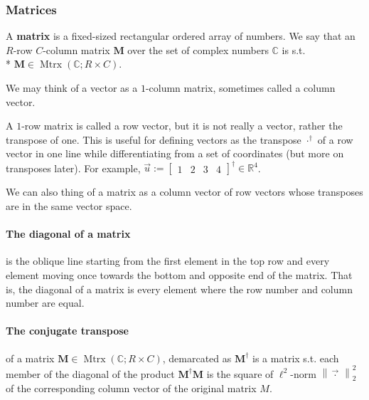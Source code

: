 \documentclass{article}
\begin{document}
\subsubsection{Matrices}
A \textbf{matrix} is a fixed-sized rectangular ordered array of numbers. We say that an $R$-row $C$-column matrix $\mathbf{M}$ over the set of complex numbers $\mathbb{C}$ is s.t.\\* $\mathbf{M} \in \operatorname{Mtrx}(\mathbb{C}; R\times C)$.

We may think of a vector as a $1$-column matrix, sometimes called a column vector.

A $1$-row matrix is called a row vector, but it is not really a vector, rather the transpose of one. This is useful for defining vectors as the transpose
$\cdot^\dagger$
of a row vector in one line while differentiating from a set of coordinates (but more on transposes later). For example, $\vec{u} := \left[
    \begin{matrix}
        1 & 2 & 3 & 4
    \end{matrix}
\right]^\dagger \in \mathbb{R}^4$.

We can also thing of a matrix as a column vector of row vectors whose transposes are in the same vector space.

\paragraph{The diagonal of a matrix} is the oblique line starting from the first element in the top row and every element moving once towards the bottom and opposite end of the matrix. That is, the diagonal of a matrix is every element where the row number and column number are equal.

\paragraph{The conjugate transpose}
of a matrix $\mathbf{M} \in \operatorname{Mtrx}(\mathbb{C}; R\times C)$, demarcated as $\mathbf{M}^\dagger$ is a matrix s.t. each member of the diagonal of the product $\mathbf{M}^\dagger \mathbf{M}$ is the square of $\ell^2$-norm $\left\lVert\vec\cdot\,\right\rVert_2^2$ of the corresponding column vector of the original matrix $M$.
\end{document}
